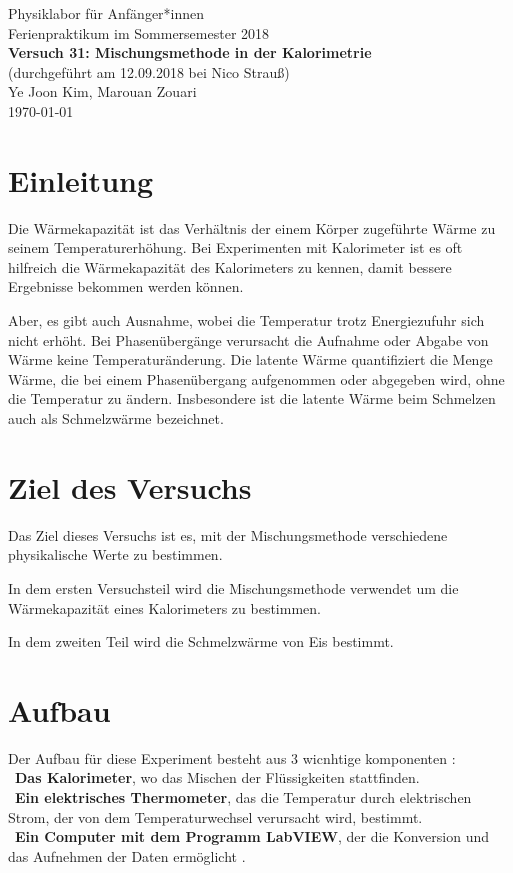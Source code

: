 \documentclass[11pt,a4paper]{article} %
\begin{document}
	

{
	\centering 
	\large 
	Physiklabor für Anfänger*innen \\
	Ferienpraktikum im Sommersemester 2018 \\[4mm]
	\textbf{\LARGE 
		Versuch 31: Mischungsmethode in der Kalorimetrie
	} \\[3mm]
	(durchgeführt am 12.09.2018 bei Nico Strauß) \\
	Ye Joon Kim, Marouan Zouari\\
	\today \\[10mm]
}

\tableofcontents
\section{Einleitung}
Die Wärmekapazität ist das Verhältnis der einem Körper zugeführte Wärme zu seinem Temperaturerhöhung. Bei Experimenten mit Kalorimeter ist es oft hilfreich die Wärmekapazität des Kalorimeters zu kennen, damit bessere Ergebnisse bekommen werden können. 

Aber, es gibt auch Ausnahme, wobei die Temperatur trotz Energiezufuhr sich nicht erhöht. Bei Phasenübergänge verursacht die Aufnahme oder Abgabe von Wärme keine Temperaturänderung. Die latente Wärme quantifiziert die Menge Wärme, die bei einem Phasenübergang aufgenommen oder abgegeben wird, ohne die Temperatur zu ändern. Insbesondere ist die latente Wärme beim Schmelzen auch als Schmelzwärme bezeichnet. 


\section{Ziel des Versuchs}
Das Ziel dieses Versuchs ist es, mit der Mischungsmethode verschiedene physikalische Werte zu bestimmen. 

In dem ersten Versuchsteil wird die Mischungsmethode verwendet um die Wärmekapazität eines Kalorimeters zu bestimmen.

 In dem zweiten Teil wird die Schmelzwärme von Eis bestimmt. 

\section{Aufbau}
Der Aufbau f\"ur diese Experiment besteht aus 3 wicnhtige komponenten :
\\\
\textbf{Das Kalorimeter}, wo das Mischen der Flüssigkeiten stattfinden.
\\\
\textbf{Ein elektrisches Thermometer}, das die Temperatur durch elektrischen Strom, der von dem Temperaturwechsel verursacht wird, bestimmt.
\\\
\textbf{Ein Computer mit dem Programm LabVIEW}, der die Konversion und das Aufnehmen der Daten erm\"oglicht .
\end{document}
